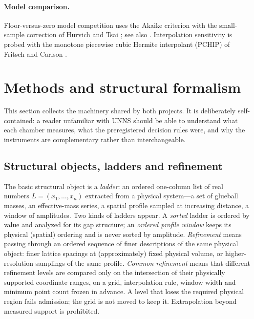 \documentclass[11pt,a4paper]{article}
\theoremstyle{definition}
\theoremstyle{remark}
\newcommand{\uns}{UNNS}
\begin{document}
\paragraph{Model comparison.} Floor-versus-zero model competition uses the Akaike criterion \cite{Akaike74} with the small-sample correction of Hurvich and Tsai \cite{HurvichTsai89}; see also \cite{BurnhamAnderson02}. Interpolation sensitivity is probed with the monotone piecewise cubic Hermite interpolant (PCHIP) of Fritsch and Carlson \cite{FritschCarlson80}.

\section{Methods and structural formalism}\label{sec:methods}

This section collects the machinery shared by both projects. It is deliberately self-contained: a reader unfamiliar with \uns{} should be able to understand what each chamber measures, what the preregistered decision rules were, and why the instruments are complementary rather than interchangeable.

\subsection{Structural objects, ladders and refinement}
The basic structural object is a \emph{ladder}: an ordered one-column list of real numbers $L=(x_1,\dots,x_n)$ extracted from a physical system---a set of glueball masses, an effective-mass series, a spatial profile sampled at increasing distance, a window of amplitudes. Two kinds of ladders appear. A \emph{sorted} ladder is ordered by value and analyzed for its gap structure; an \emph{ordered profile window} keeps its physical (spatial) ordering and is never sorted by amplitude. \emph{Refinement} means passing through an ordered sequence of finer descriptions of the same physical object: finer lattice spacings at (approximately) fixed physical volume, or higher-resolution samplings of the same profile. \emph{Common refinement} means that different refinement levels are compared only on the intersection of their physically supported coordinate ranges, on a grid, interpolation rule, window width and minimum point count frozen in advance. A level that loses the required physical region fails admission; the grid is not moved to keep it. Extrapolation beyond measured support is prohibited.
\end{document}
